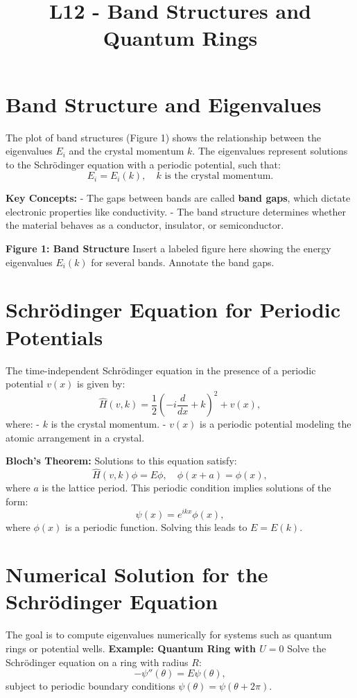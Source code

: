 \documentclass[a4paper,12pt]{article}
\begin{document}
\title{L12 - Band Structures and Quantum Rings}
\author{}
\date{}
\maketitle
\begin{multicols}{2}

\section{Band Structure and Eigenvalues}
The plot of band structures (Figure 1) shows the relationship between the eigenvalues $E_i$ and the crystal momentum $k$. The eigenvalues represent solutions to the Schrödinger equation with a periodic potential, such that:  
\[
E_i = E_i(k), \quad k \text{ is the crystal momentum.}
\]

\textbf{Key Concepts:}
- The gaps between bands are called \textbf{band gaps}, which dictate electronic properties like conductivity.
- The band structure determines whether the material behaves as a conductor, insulator, or semiconductor.

\textbf{Figure 1: Band Structure}  
Insert a labeled figure here showing the energy eigenvalues $E_i(k)$ for several bands. Annotate the band gaps.

\section{Schrödinger Equation for Periodic Potentials}
The time-independent Schrödinger equation in the presence of a periodic potential $v(x)$ is given by:
\[
\hat{H}(v, k) = \frac{1}{2}\left(-i \frac{d}{dx} + k \right)^2 + v(x),
\]
where:
- $k$ is the crystal momentum.
- $v(x)$ is a periodic potential modeling the atomic arrangement in a crystal.

\textbf{Bloch's Theorem:} Solutions to this equation satisfy:
\[
\hat{H}(v, k)\phi = E\phi, \quad \phi(x+a) = \phi(x),
\]
where $a$ is the lattice period. This periodic condition implies solutions of the form:
\[
\psi(x) = e^{ikx}\phi(x),
\]
where $\phi(x)$ is a periodic function. Solving this leads to $E = E(k)$.

\section{Numerical Solution for the Schrödinger Equation}
The goal is to compute eigenvalues numerically for systems such as quantum rings or potential wells.  
\textbf{Example: Quantum Ring with $U=0$}
Solve the Schrödinger equation on a ring with radius $R$:
\[
-\psi''(\theta) = E\psi(\theta),
\]
subject to periodic boundary conditions $\psi(\theta) = \psi(\theta+2\pi)$.  


\end{multicols}
\end{document}
